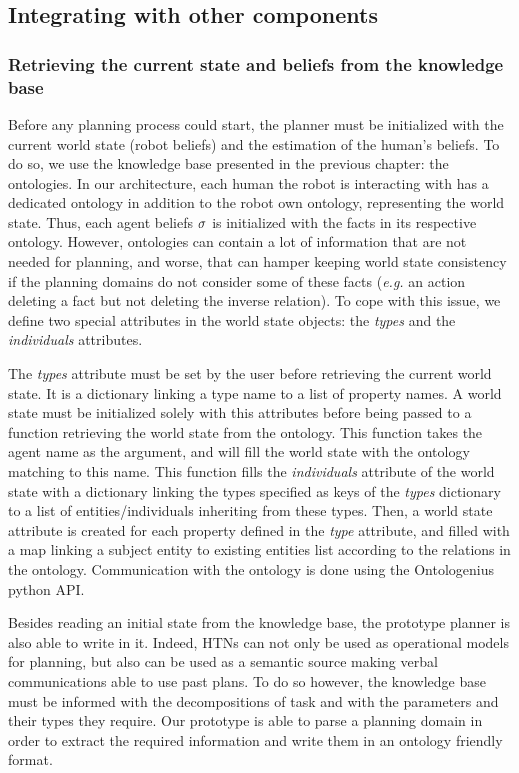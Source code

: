 \documentclass[a4paper,11pt,twoside]{StyleThese}
\begin{document}
\subsection{Integrating with other components}
\label{subsec:chap4integratingwithothers}
\subsubsection{Retrieving the current state and beliefs from the knowledge base}
Before any planning process could start, the planner must be initialized with the current world state (robot beliefs) and the estimation of the human's beliefs. To do so, we use the knowledge base presented in the previous chapter: the ontologies. In our architecture, each human the robot is interacting with has a dedicated ontology in addition to the robot own ontology, representing the world state. Thus, each agent beliefs $\sigma$ is initialized with the facts in its respective ontology.
However, ontologies can contain a lot of information that are not needed for planning, and worse, that can hamper keeping world state consistency if the planning domains do not consider some of these facts (\textit{e.g.} an action deleting a fact but not deleting the inverse relation). To cope with this issue, we define two special attributes in the world state objects: the \textit{types} and the \textit{individuals} attributes.

The \textit{types} attribute must be set by the user before retrieving the current world state. It is a dictionary linking a type name to a list of property names. A world state must be initialized solely with this attributes before being passed to a function retrieving the world state from the ontology. This function takes the agent name as the argument, and will fill the world state with the ontology matching to this name. This function fills the \textit{individuals} attribute of the world state with a dictionary linking the types specified as keys of the  \textit{types} dictionary to a list of entities/individuals inheriting from these types. Then, a world state attribute is created for each property defined in the \textit{type} attribute, and filled with a map linking a subject entity to existing entities list according to the relations in the ontology. Communication with the ontology is done using the Ontologenius~\cite{sarthou2019ontologenius} python API.

Besides reading an initial state from the knowledge base, the prototype planner is also able to write in it. Indeed, HTNs can not only be used as operational models for planning, but also can be used as a semantic source making verbal communications able to use past plans. To do so however, the knowledge base must be informed with the decompositions of task and with the parameters and their types they require. Our prototype is able to parse a planning domain in order to extract the required information and write them in an ontology friendly format.
\end{document}
